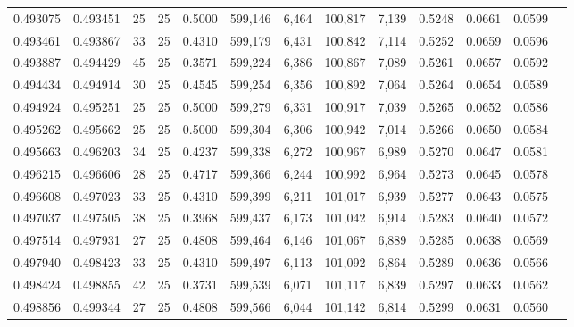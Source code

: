 \begin{tabular}{rrrrrrrrrrrrr}
0.493075 & 0.493451 &    25 &  25 &                                     0.5000 & 599,146 &   6,464 & 100,817 &   7,139 & 0.5248 & 0.0661 & 0.0599 \\
0.493461 & 0.493867 &    33 &  25 &                                     0.4310 & 599,179 &   6,431 & 100,842 &   7,114 & 0.5252 & 0.0659 & 0.0596 \\
0.493887 & 0.494429 &    45 &  25 &                                     0.3571 & 599,224 &   6,386 & 100,867 &   7,089 & 0.5261 & 0.0657 & 0.0592 \\
0.494434 & 0.494914 &    30 &  25 &                                     0.4545 & 599,254 &   6,356 & 100,892 &   7,064 & 0.5264 & 0.0654 & 0.0589 \\
0.494924 & 0.495251 &    25 &  25 &                                     0.5000 & 599,279 &   6,331 & 100,917 &   7,039 & 0.5265 & 0.0652 & 0.0586 \\
0.495262 & 0.495662 &    25 &  25 &                                     0.5000 & 599,304 &   6,306 & 100,942 &   7,014 & 0.5266 & 0.0650 & 0.0584 \\
0.495663 & 0.496203 &    34 &  25 &                                     0.4237 & 599,338 &   6,272 & 100,967 &   6,989 & 0.5270 & 0.0647 & 0.0581 \\
0.496215 & 0.496606 &    28 &  25 &                                     0.4717 & 599,366 &   6,244 & 100,992 &   6,964 & 0.5273 & 0.0645 & 0.0578 \\
0.496608 & 0.497023 &    33 &  25 &                                     0.4310 & 599,399 &   6,211 & 101,017 &   6,939 & 0.5277 & 0.0643 & 0.0575 \\
0.497037 & 0.497505 &    38 &  25 &                                     0.3968 & 599,437 &   6,173 & 101,042 &   6,914 & 0.5283 & 0.0640 & 0.0572 \\
0.497514 & 0.497931 &    27 &  25 &                                     0.4808 & 599,464 &   6,146 & 101,067 &   6,889 & 0.5285 & 0.0638 & 0.0569 \\
0.497940 & 0.498423 &    33 &  25 &                                     0.4310 & 599,497 &   6,113 & 101,092 &   6,864 & 0.5289 & 0.0636 & 0.0566 \\
0.498424 & 0.498855 &    42 &  25 &                                     0.3731 & 599,539 &   6,071 & 101,117 &   6,839 & 0.5297 & 0.0633 & 0.0562 \\
0.498856 & 0.499344 &    27 &  25 &                                     0.4808 & 599,566 &   6,044 & 101,142 &   6,814 & 0.5299 & 0.0631 & 0.0560 \\

\end{tabular}
